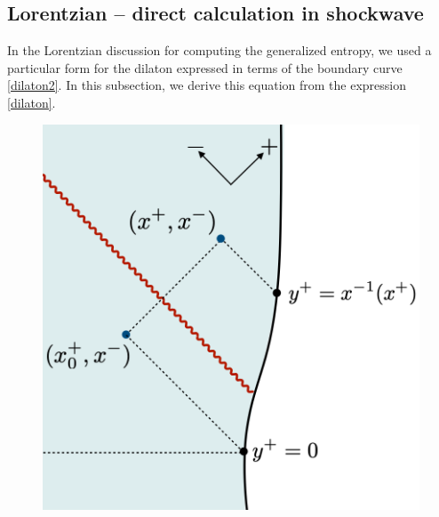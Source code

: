 \documentclass[12pt]{article}
\numberwithin{equation}{section}
\begin{document}
\begin{spacing}{1.1}
\subsection{Lorentzian -- direct calculation in shockwave}\label{app:dil-lor}

In the Lorentzian discussion for computing the generalized entropy, we used a particular form for the dilaton expressed in terms of the boundary curve \eqref{dilaton2}.
In this subsection, we derive this equation from the expression \eqref{dilaton}.

\begin{figure}
\centering
\includegraphics[scale=0.35]{./figures/Dilatonderive.png}
\caption{}\label{Dilatonderive}
\end{figure}


\end{spacing}
\end{document}
